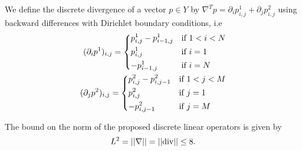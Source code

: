     \begin{definition} %
    \label{def:discrete_divergence_operator}

        We define the discrete divergence of a vector $p \in Y$ by $\nabla^{T} p = \partial_{i}p^{1}_{i, j} + \partial_{j}p^{2}_{i, j}$ using backward differences with Dirichlet boundary conditions, i.e
            \begin{eqnarray}
                (\partial_{i}p^{1})_{i, j} =
                    \begin{dcases*}
                        p^{1}_{i, j} - p^{1}_{i-1, j} & \textnormal{if $1 < i < N$}\\
                        p^{1}_{i, j} & \textnormal{if $i = 1$}\\
                        -p^{1}_{i-1, j} & \textnormal{if $i = N$}
                    \end{dcases*}
                \label{eq:backward_partial_i} \\
                (\partial_{j}p^{2})_{i, j} =
                    \begin{dcases*}
                        p^{2}_{i, j} - p^{2}_{i, j-1} & \textnormal{if $1 < j < M$}\\
                        p^{2}_{i, j} & \textnormal{if $j = 1$}\\
                        -p^{2}_{i, j-1} & \textnormal{if $j = M$}
                    \end{dcases*}
                \label{eq:backward_partial_j}
            \end{eqnarray}

    \end{definition}

    \begin{proposition} %
        \label{prop:bound_on_the_norm}

        The bound on the norm of the proposed discrete linear operators is given by
            \begin{equation}
                L^{2} = ||\nabla|| = ||\textnormal{div}|| \le 8.
            \end{equation}

    \end{proposition}

